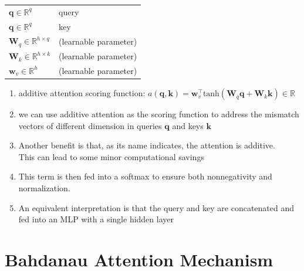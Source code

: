 \begin{customTableWrapper}{1.5}
\begin{longtable}{l p{8cm}}
    $\mathbf{q} \in \mathbb{R}^q$ & query \\

    $\mathbf{q} \in \mathbb{R}^q$ & key \\

    $\mathbf W_q\in\mathbb R^{h\times q}$ & (learnable parameter) \\

    $\mathbf W_k\in\mathbb R^{h\times k}$ & (learnable parameter)\\

    $\mathbf w_v\in\mathbb R^{h}$ & (learnable parameter) \\
\end{longtable}
\end{customTableWrapper}

\begin{enumerate}
    \item additive attention scoring function: $a(\mathbf q, \mathbf k) = \mathbf w_v^\top \textrm{tanh}(\mathbf W_q\mathbf q + \mathbf W_k \mathbf k) \in \mathbb{R}$

    \item we can use additive attention as the scoring function to address the mismatch vectors of different dimension in queries $\mathbf{q}$ and keys $\mathbf{k}$

    \item Another benefit is that, as its name indicates, the attention is additive.\\
    This can lead to some minor computational savings

    \item This term is then fed into a softmax to ensure both nonnegativity and normalization.

    \item An equivalent interpretation is that the query and key are concatenated and fed into an MLP with a single hidden layer
\end{enumerate}



\section{Bahdanau Attention Mechanism \cite{dnn-1}}

